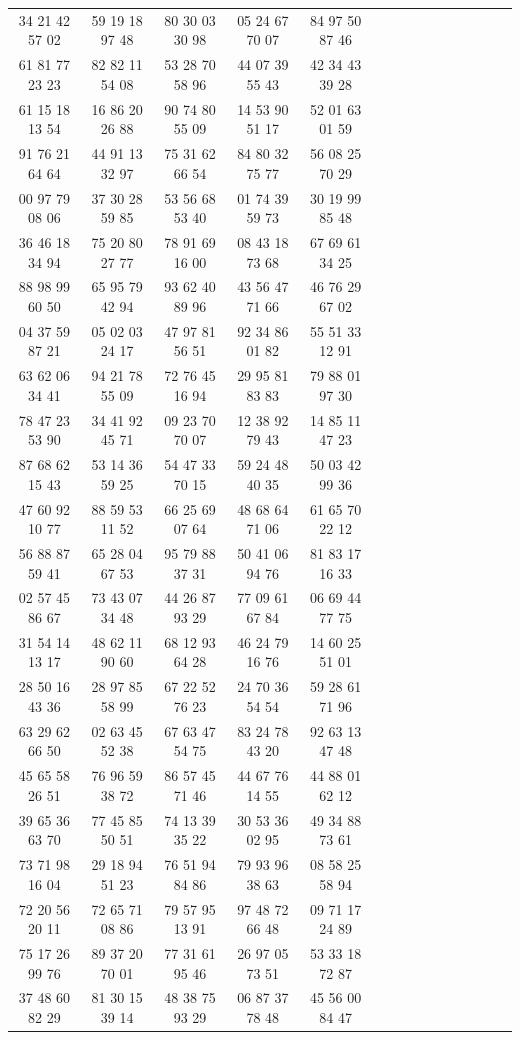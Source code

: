\documentclass[lang=cn,10pt]{elegantbook}
\begin{document}
\begin{longtable}{ccccccccccccccc}
    34 21 42 57 02 & 59 19 18 97 48 & 80 30 03 30 98 & 05 24 67 70 07 & 84 97 50 87 46 \\
    61 81 77 23 23 & 82 82 11 54 08 & 53 28 70 58 96 & 44 07 39 55 43 & 42 34 43 39 28 \\
    61 15 18 13 54 & 16 86 20 26 88 & 90 74 80 55 09 & 14 53 90 51 17 & 52 01 63 01 59 \\
    91 76 21 64 64 & 44 91 13 32 97 & 75 31 62 66 54 & 84 80 32 75 77 & 56 08 25 70 29 \\
    00 97 79 08 06 & 37 30 28 59 85 & 53 56 68 53 40 & 01 74 39 59 73 & 30 19 99 85 48 \\
    36 46 18 34 94 & 75 20 80 27 77 & 78 91 69 16 00 & 08 43 18 73 68 & 67 69 61 34 25 \\
    88 98 99 60 50 & 65 95 79 42 94 & 93 62 40 89 96 & 43 56 47 71 66 & 46 76 29 67 02 \\
    04 37 59 87 21 & 05 02 03 24 17 & 47 97 81 56 51 & 92 34 86 01 82 & 55 51 33 12 91 \\
    63 62 06 34 41 & 94 21 78 55 09 & 72 76 45 16 94 & 29 95 81 83 83 & 79 88 01 97 30 \\
    78 47 23 53 90 & 34 41 92 45 71 & 09 23 70 70 07 & 12 38 92 79 43 & 14 85 11 47 23 \\
    87 68 62 15 43 & 53 14 36 59 25 & 54 47 33 70 15 & 59 24 48 40 35 & 50 03 42 99 36 \\
    47 60 92 10 77 & 88 59 53 11 52 & 66 25 69 07 64 & 48 68 64 71 06 & 61 65 70 22 12 \\
    56 88 87 59 41 & 65 28 04 67 53 & 95 79 88 37 31 & 50 41 06 94 76 & 81 83 17 16 33 \\
    02 57 45 86 67 & 73 43 07 34 48 & 44 26 87 93 29 & 77 09 61 67 84 & 06 69 44 77 75 \\
    31 54 14 13 17 & 48 62 11 90 60 & 68 12 93 64 28 & 46 24 79 16 76 & 14 60 25 51 01 \\
    28 50 16 43 36 & 28 97 85 58 99 & 67 22 52 76 23 & 24 70 36 54 54 & 59 28 61 71 96 \\
    63 29 62 66 50 & 02 63 45 52 38 & 67 63 47 54 75 & 83 24 78 43 20 & 92 63 13 47 48 \\
    45 65 58 26 51 & 76 96 59 38 72 & 86 57 45 71 46 & 44 67 76 14 55 & 44 88 01 62 12 \\
    39 65 36 63 70 & 77 45 85 50 51 & 74 13 39 35 22 & 30 53 36 02 95 & 49 34 88 73 61 \\
    73 71 98 16 04 & 29 18 94 51 23 & 76 51 94 84 86 & 79 93 96 38 63 & 08 58 25 58 94 \\
    72 20 56 20 11 & 72 65 71 08 86 & 79 57 95 13 91 & 97 48 72 66 48 & 09 71 17 24 89 \\
    75 17 26 99 76 & 89 37 20 70 01 & 77 31 61 95 46 & 26 97 05 73 51 & 53 33 18 72 87 \\
    37 48 60 82 29 & 81 30 15 39 14 & 48 38 75 93 29 & 06 87 37 78 48 & 45 56 00 84 47 \\
    \hline
\end{longtable}
\end{document}
